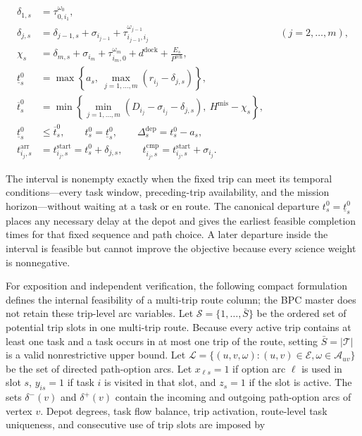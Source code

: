 \documentclass[
  11pt,
]{article}
\begin{document}
\[
\begin{aligned}
\delta_{1,s}
&=\tau_{0,i_1}^{\omega_0},\\
\delta_{j,s}
&=\delta_{j-1,s}+\sigma_{i_{j-1}}
  +\tau_{i_{j-1},i_j}^{\omega_{j-1}}
&& (j=2,\ldots,m),\\
\chi_s
&=\delta_{m,s}+\sigma_{i_m}+\tau_{i_m,0}^{\omega_m}
  +d^{\mathrm{dock}}+\frac{E_s}{P^{\mathrm{rch}}},\\
\underline t_s^0
&=\max\left\{a_s,\ \max_{j=1,\ldots,m}
  \left(r_{i_j}-\delta_{j,s}\right)\right\},\\
\overline t_s^0
&=\min\left\{
  \min_{j=1,\ldots,m}
  \left(D_{i_j}-\sigma_{i_j}-\delta_{j,s}\right),\
  H^{\mathrm{mis}}-\chi_s
  \right\},\\
\underline t_s^0&\le\overline t_s^0,\qquad
t_s^0=\underline t_s^0,\qquad
\Delta_s^{\mathrm{dep}}=t_s^0-a_s,\\
t_{i_j,s}^{\mathrm{arr}}
&=t_{i_j,s}^{\mathrm{start}}=t_s^0+\delta_{j,s},\qquad
t_{i_j,s}^{\mathrm{cmp}}=t_{i_j,s}^{\mathrm{start}}+\sigma_{i_j}.
\end{aligned}
\tag{3}
\]

The interval is nonempty exactly when the fixed trip can meet its
temporal conditions---every task window, preceding-trip availability,
and the mission horizon---without waiting at a task or en route. The
canonical departure \(t_s^0=\underline t_s^0\) places any necessary
delay at the depot and gives the earliest feasible completion times for
that fixed sequence and path choice. A later departure inside the
interval is feasible but cannot improve the objective because every
science weight is nonnegative.

For exposition and independent verification, the following compact
formulation defines the internal feasibility of a multi-trip route
column; the BPC master does not retain these trip-level arc variables.
Let \(\mathcal{S}=\{1,\ldots,\bar S\}\) be the ordered set of potential
trip slots in one multi-trip route. Because every active trip contains
at least one task and a task occurs in at most one trip of the route,
setting \(\bar S=|\mathcal{T}|\) is a valid nonrestrictive upper bound.
Let
\(\mathcal{L}=\{(u,v,\omega):(u,v)\in\mathcal{E}, \omega\in\mathcal{A}_{uv}\}\)
be the set of directed path-option arcs. Let \(x_{\ell s}=1\) if option
arc \(\ell\) is used in slot \(s\), \(y_{is}=1\) if task \(i\) is
visited in that slot, and \(z_s=1\) if the slot is active. The sets
\(\delta^-(v)\) and \(\delta^+(v)\) contain the incoming and outgoing
path-option arcs of vertex \(v\). Depot degrees, task flow balance, trip
activation, route-level task uniqueness, and consecutive use of trip
slots are imposed by
\end{document}
